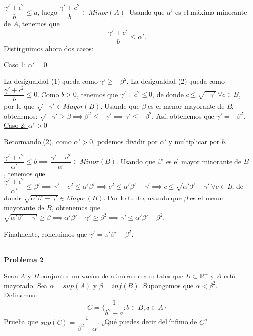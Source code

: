 \documentclass[10pt,a4paper]{article}
\begin{document}
	$\dfrac{\gamma' + c^2}{b} \leq a$, luego $\dfrac{\gamma'+c^2}{b} \in Minor(A)$. Usando que $\alpha'$ es el máximo minorante de $A$, tenemos que \begin{equation}
		\dfrac{\gamma'+c^2}{b} \leq \alpha'.
	\end{equation} Distinguimos ahora dos casos: \newline
	
	\underline{Caso 1: $\alpha' = 0$} \newline
	
	La desigualdad (1) queda como $\gamma' \geq -\beta^2$. La desigualdad (2) queda como $\dfrac{\gamma'+c^2}{b} \leq 0$. Como $b > 0$, tenemos que $\gamma' + c^2 \leq 0$, de donde $c \leq \sqrt{-\gamma'} ~ \forall c \in B$, por lo que $\sqrt{-\gamma'} \in Mayor(B)$. Usando que $\beta$ es el menor mayorante de $B$, obtenemos: $\sqrt{-\gamma'} \geq \beta \implies \beta^2 \leq -\gamma' \implies \gamma' \leq -\beta^2$. Así, obtenemos que $\gamma' = -\beta^2$. \\
	
	\underline{Caso 2: $\alpha' > 0$} \newline
	
	Retormando (2), como $\alpha' > 0$, podemos dividir por $\alpha'$ y multiplicar por $b$.
	
	$\dfrac{\gamma'+c^2}{\alpha'} \leq b \implies \dfrac{\gamma'+c^2}{\alpha'} \in Minor(B)$. Usando que $\beta'$ es el mayor minorante de $B$, tenemos que $\dfrac{\gamma'+c^2}{\alpha'} \leq \beta' \implies \gamma'+c^2 \leq \alpha'\beta' \implies c^2 \leq \alpha'\beta'-\gamma' \implies c \leq \sqrt{\alpha'\beta'-\gamma'} ~ \forall c \in B$, de donde $\sqrt{\alpha'\beta'-\gamma'} \in Mayor(B)$. Por lo tanto, usando que $\beta$ es el menor mayorante de $B$, obtenemos que $\sqrt{\alpha'\beta'-\gamma'} \geq \beta \implies \alpha'\beta'-\gamma' \geq \beta^2 \implies \gamma' \leq \alpha'\beta'-\beta^2$. \newline
	
	Finalmente, concluimos que $\gamma' = \alpha'\beta'-\beta^2$. \\ \\
	
	\begin{flushleft}
		\textbf{\underline{Problema 2}}
	\end{flushleft}	

	Sean $A$ y $B$ conjuntos no vacíos de números reales tales que $B \subset \mathbb{R^+}$ y $A$ está mayorado. Sea $\alpha = sup(A)$ y $\beta = inf(B)$. Supongamos que $\alpha < \beta^2$. Definamos: 
	$$C=\{\dfrac{1}{b^2-a} : b \in B, a \in A\}$$
	Prueba que $sup(C)=\dfrac{1}{\beta^2-\alpha}$. ¿Qué puedes decir del ínfimo de $C$? \\ \\
	
\end{document}
